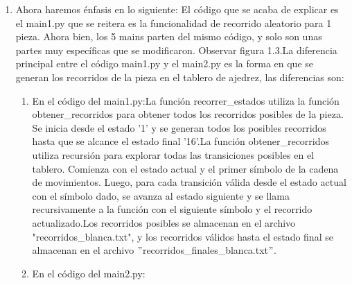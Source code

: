 \begin{enumerate}
\begin{enumerate}
\begin{enumerate}
    \end{enumerate}
\end{enumerate}

\item Ahora haremos énfasis en lo siguiente: El código que se acaba de explicar es el main1.py que se reitera es la funcionalidad de recorrido aleatorio para 1 pieza. Ahora bien, los 5 mains parten del mismo código, y solo son unas partes muy específicas que se modificaron. Observar figura 1.3.\newline La diferencia principal entre el código main1.py y el main2.py es la forma en que se generan los recorridos de la pieza en el tablero de ajedrez, las diferencias son: \newline
\begin{enumerate}
\item En el código del main1.py:\newline La función recorrer\_estados utiliza la función obtener\_recorridos para obtener todos los recorridos posibles de la pieza. Se inicia desde el estado '1' y se generan todos los posibles recorridos hasta que se alcance el estado final '16'.\newline  La función obtener\_recorridos utiliza recursión para explorar todas las transiciones posibles en el tablero. Comienza con el estado actual y el primer símbolo de la cadena de movimientos. Luego, para cada transición válida desde el estado actual con el símbolo dado, se avanza al estado siguiente y se llama recursivamente a la función con el siguiente símbolo y el recorrido actualizado.\newline Los recorridos posibles se almacenan en el archivo "recorridos\_blanca.txt", y los recorridos válidos hasta el estado final se almacenan en el archivo $"$recorridos\_finales\_blanca.txt$"$.\newline

\item En el código del main2.py:\newline


\end{enumerate}
\end{enumerate}
